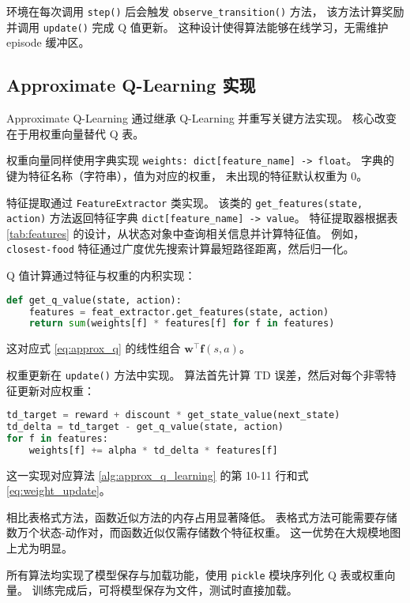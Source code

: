 环境在每次调用 \texttt{step()} 后会触发 \texttt{observe\_transition()} 方法，
该方法计算奖励并调用 \texttt{update()} 完成 Q 值更新。
这种设计使得算法能够在线学习，无需维护 episode 缓冲区。

\subsection{Approximate Q-Learning 实现}

Approximate Q-Learning 通过继承 Q-Learning 并重写关键方法实现。
核心改变在于用权重向量替代 Q 表。

权重向量同样使用字典实现 \texttt{weights: dict[feature\_name] -> float}。
字典的键为特征名称（字符串），值为对应的权重，
未出现的特征默认权重为 0。

特征提取通过 \texttt{FeatureExtractor} 类实现。
该类的 \texttt{get\_features(state, action)} 方法返回特征字典 \texttt{dict[feature\_name] -> value}。
特征提取器根据表 \ref{tab:features} 的设计，从状态对象中查询相关信息并计算特征值。
例如，\texttt{closest-food} 特征通过广度优先搜索计算最短路径距离，然后归一化。

Q 值计算通过特征与权重的内积实现：
\begin{lstlisting}[language=Python, basicstyle=\small\ttfamily]
def get_q_value(state, action):
    features = feat_extractor.get_features(state, action)
    return sum(weights[f] * features[f] for f in features)
\end{lstlisting}
这对应式 \eqref{eq:approx_q} 的线性组合 $\mathbf{w}^\top \mathbf{f}(s,a)$。

权重更新在 \texttt{update()} 方法中实现。
算法首先计算 TD 误差，然后对每个非零特征更新对应权重：
\begin{lstlisting}[language=Python, basicstyle=\small\ttfamily]
td_target = reward + discount * get_state_value(next_state)
td_delta = td_target - get_q_value(state, action)
for f in features:
    weights[f] += alpha * td_delta * features[f]
\end{lstlisting}
这一实现对应算法 \ref{alg:approx_q_learning} 的第 10-11 行和式 \eqref{eq:weight_update}。

相比表格式方法，函数近似方法的内存占用显著降低。
表格式方法可能需要存储数万个状态-动作对，而函数近似仅需存储数个特征权重。
这一优势在大规模地图上尤为明显。

所有算法均实现了模型保存与加载功能，使用 \texttt{pickle} 模块序列化 Q 表或权重向量。
训练完成后，可将模型保存为文件，测试时直接加载。


